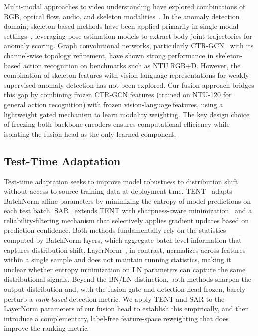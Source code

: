 \documentclass[sigconf]{acmart}
\begin{document}
Multi-modal approaches to video understanding have explored combinations of RGB, optical flow, audio, and skeleton modalities~\cite{carreira2017i3d}. In the anomaly detection domain, skeleton-based methods have been applied primarily in single-modal settings~\cite{doshi2022skeleton}, leveraging pose estimation models to extract body joint trajectories for anomaly scoring. Graph convolutional networks, particularly CTR-GCN~\cite{chen2021ctrgcn} with its channel-wise topology refinement, have shown strong performance in skeleton-based action recognition on benchmarks such as NTU RGB+D. However, the combination of skeleton features with vision-language representations
for weakly supervised anomaly detection has not been explored.
Our fusion approach bridges this gap by combining frozen CTR-GCN features
(trained on NTU-120 for general action recognition) with frozen vision-language
features, using a lightweight gated mechanism to learn modality weighting.
The key design choice of freezing both backbone encoders ensures computational
efficiency while isolating the fusion head as the only learned component.

\subsection{Test-Time Adaptation}

Test-time adaptation seeks to improve model robustness to distribution shift without access to source training data at deployment time. TENT~\cite{wang2021tent} adapts BatchNorm affine parameters by minimizing the entropy of model predictions on each test batch. SAR~\cite{niu2023sar} extends TENT with sharpness-aware minimization~\cite{foret2021sam} and a reliability-filtering mechanism that selectively applies gradient updates based on prediction confidence. Both methods fundamentally rely on the statistics computed by BatchNorm layers, which aggregate batch-level information that captures distribution shift. LayerNorm~\cite{ba2016layernorm}, in contrast, normalizes across features within a single sample and does not maintain running statistics, making it unclear whether entropy minimization on LN parameters can capture the same distributional signals. Beyond the BN/LN distinction, both methods sharpen the output distribution and, with the fusion gate and detection head frozen, barely perturb a \emph{rank-based} detection metric. We apply TENT and SAR to the LayerNorm parameters of our fusion head to establish this empirically, and then introduce a complementary, label-free feature-space reweighting that does improve the ranking metric.
\end{document}
